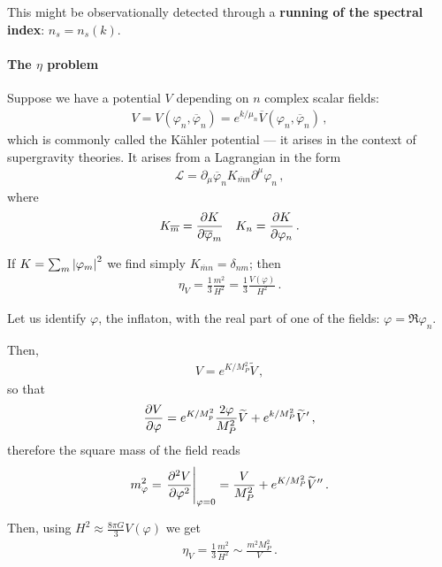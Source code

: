 \documentclass[main.tex]{subfiles}
\begin{document}
This might be observationally detected through a \textbf{running of the spectral index}: \(n_s = n_s (k)\). 

\paragraph{The \(\eta \) problem}

Suppose we have a potential \(V\) depending on \(n\) complex scalar fields: 
%
\begin{align}
V = V(\varphi _n, \overline{\varphi} _n) = e^{k / \mu _n} \overline{V} (\varphi _n, \overline{\varphi}_n)
\,,
\end{align}
%
which is commonly called the Kähler potential --- it arises in the context of supergravity theories. 
It arises from a Lagrangian in the form 
%
\begin{align}
\mathscr{L} = \partial_{\mu } \overline{\varphi}_{n} K_{\overline{m} n} \partial^{\mu } \varphi_n
\,,
\end{align}
%
where 
%
\begin{align}
K_{\overline{m}} = \pdv{K}{\overline{\varphi}_m} &&
K_{n} = \pdv{K}{\varphi_n} 
\,.
\end{align}

If \(K = \sum _{m} \abs{\varphi _m}^2\) we find simply \(K_{\overline{m} n} = \delta_{nm}\); then 
%
\begin{align}
\eta _V = \frac{1}{3} \frac{m^2}{H^2} = \frac{1}{3} \frac{V(\varphi )}{H^2}
\,.
\end{align}

Let us identify \(\varphi \), the inflaton, with the real part of one of the fields: \(\varphi = \Re \varphi _n\).  

Then, 
%
\begin{align}
V = e^{K / M_P^2} \widetilde{V}
\,,
\end{align}
%
so that 
%
\begin{align}
\pdv{V}{\varphi } = e^{K / M_p^2} \frac{2 \varphi }{M_P^2} \widetilde{V} + e^{k / M_P^2} \widetilde{V}'
\,,
\end{align}
%
therefore the square mass of the field reads 
%
\begin{align}
m_\varphi^2= \eval{\pdv[2]{V}{\varphi }}_{\varphi = 0} = \frac{V}{M_P^2} + e^{K / M_P^2} \widetilde{V}''
\,.
\end{align}

Then, using \(H^2 \approx \frac{8 \pi G}{3} V(\varphi )\) we get 
%
\begin{align}
\eta _V = \frac{1}{3} \frac{m^2}{H^2} \sim \frac{m^2 M_P^2}{V}
\,.
\end{align}
\end{document}
